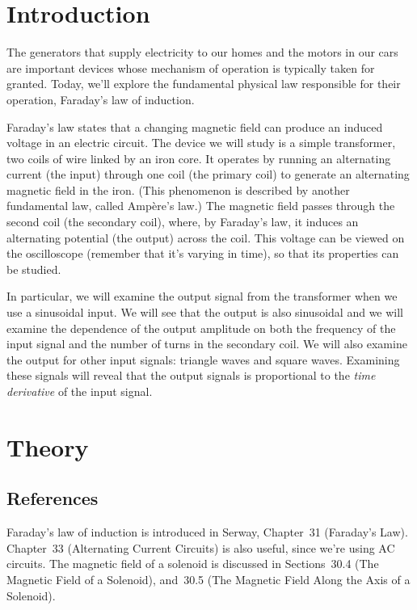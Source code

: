 \section{Introduction}

The generators that supply electricity to our homes and the motors in our cars
are important devices whose mechanism of operation is typically taken for 
granted. Today, we'll explore the fundamental physical law responsible for 
their operation, Faraday's law of induction.

Faraday's law states that a changing magnetic field can produce an induced 
voltage in an electric circuit.  The device we will study is a simple
transformer, two coils of wire linked by an iron core.  It operates by
running an alternating current (the input) through one coil (the primary coil)
to generate an alternating magnetic field in the iron. (This phenomenon is 
described by another fundamental law, called Amp\`{e}re's law.)  The magnetic 
field passes through the second coil (the secondary coil), where, by Faraday's 
law, it induces an alternating potential (the output) across the coil. This 
voltage can be viewed on the oscilloscope (remember that it's varying in time),
so that its properties can be studied.

In particular, we will examine the output signal from the transformer when we
use a sinusoidal input. We will see that the output is also sinusoidal and we
will examine the dependence of the output amplitude on both the frequency of
the input signal and the number of turns in the secondary coil. We will also
examine the output for other input signals: triangle waves and square waves.
Examining these signals will reveal that the output signals is proportional
to the {\it time derivative} of the input signal.

\vfill
\pagebreak

\section{Theory}

\subsection{References}

Faraday's law of induction is introduced in Serway, Chapter~31 (Faraday's
Law).  Chapter~33 (Alternating Current Circuits) is also 
useful, since we're using AC circuits.  The magnetic field of a solenoid is 
discussed in Sections~30.4 (The Magnetic Field of a Solenoid), and~30.5
(The Magnetic Field Along the Axis of a Solenoid).

